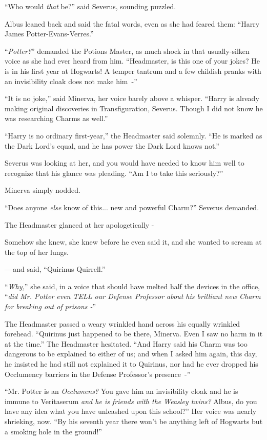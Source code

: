 ``Who would \emph{that} be?'' said Severus, sounding puzzled.

Albus leaned back and said the fatal words, even as she had feared them: ``Harry James Potter-Evans-Verres.''

``\emph{Potter?}'' demanded the Potions Master, as much shock in that usually-silken voice as she had ever heard from him. ``Headmaster, is this one of your jokes? He is in his first year at Hogwarts! A temper tantrum and a few childish pranks with an invisibility cloak does not make him~-''

``It is no joke,'' said Minerva, her voice barely above a whisper. ``Harry is already making original discoveries in Transfiguration, Severus. Though I did not know he was researching Charms as well.''

``Harry is no ordinary first-year,'' the Headmaster said solemnly. ``He is marked as the Dark Lord's equal, and he has power the Dark Lord knows not.''

Severus was looking at her, and you would have needed to know him well to recognize that his glance was pleading. ``Am I to take this seriously?''

Minerva simply nodded.

``Does anyone \emph{else} know of this... new and powerful Charm?'' Severus demanded.

The Headmaster glanced at her apologetically -

Somehow she knew, she knew before he even said it, and she wanted to scream at the top of her lungs.

---\,and said, ``Quirinus Quirrell.''

``\emph{Why,}'' she said, in a voice that should have melted half the devices in the office, ``\emph{did Mr. Potter even TELL our Defense Professor about his brilliant new Charm for breaking out of prisons -}''

The Headmaster passed a weary wrinkled hand across his equally wrinkled forehead. ``Quirinus just happened to be there, Minerva. Even I saw no harm in it at the time.'' The Headmaster hesitated. ``And Harry said his Charm was too dangerous to be explained to either of us; and when I asked him again, this day, he insisted he had still not explained it to Quirinus, nor had he ever dropped his Occlumency barriers in the Defense Professor's presence~-''

``Mr. Potter is an \emph{Occlumens?} You gave him an invisibility cloak and he is immune to Veritaserum \emph{and he is friends with the Weasley twins?} Albus, do you have any idea what you have unleashed upon this school?'' Her voice was nearly shrieking, now. ``By his seventh year there won't be anything left of Hogwarts but a smoking hole in the ground!''

